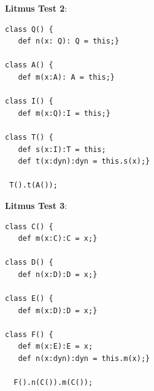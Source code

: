 \documentclass[acmlarge, anonymous, authordraft, review]{acmart} %
\begin{document}
\noindent
\textbf{Litmus Test 2}:
\begin{lstlisting}
class Q() {
   def n(x: Q): Q = this;}

class A() {
   def m(x:A): A = this;}

class I() {
   def m(x:Q):I = this;}

class T() {
   def s(x:I):T = this; 
   def t(x:dyn):dyn = this.s(x);}
   
 T().t(A());   
\end{lstlisting}


\noindent
\textbf{Litmus Test 3}:
\begin{lstlisting}
class C() { 
   def m(x:C):C = x;}

class D() {
   def n(x:D):D = x;}
      
class E() {
   def m(x:D):D = x;}      

class F() {
   def m(x:E):E = x;
   def n(x:dyn):dyn = this.m(x);} 
	     
  F().n(C()).m(C());
\end{lstlisting}
% 
% 
% 
% 
% 
% 
%       
\end{document}
